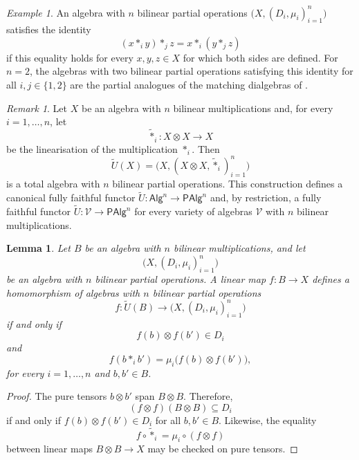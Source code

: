 \documentclass[reqno,a4paper]{amsart}
\theoremstyle{plain}
\newtheorem{lemma}[subsection]{Lemma}
\theoremstyle{definition}
\theoremstyle{remark}
\newtheorem{remark}[subsection]{Remark}
\newtheorem{example}[subsection]{Example}
\numberwithin{equation}{section}
\newcommand{\V}{\mathcal{V}}
\newcommand{\Alg}{\ensuremath{\mathsf{Alg}}}
\newcommand{\PAlg}{\ensuremath{\mathsf{PAlg}}}
\begin{document}
\begin{example}
An algebra with $n$ bilinear partial operations $\bigl(X,(D_i,\mu_i)_{i=1}^n\bigr)$ satisfies the identity
\[
(x\ast_i y)\ast_j z=x\ast_i(y\ast_j z)
\]
if this equality holds for every $x,y,z\in X$ for which both sides are defined. For $n=2$, the algebras with two bilinear partial operations satisfying this identity for all $i,j\in\{1,2\}$ are the partial analogues of the matching dialgebras of .
\end{example}

\begin{remark}\label{RemUTildeN}
Let $X$ be an algebra with $n$ bilinear multiplications and, for every $i=1,\ldots,n$, let
\[
\widetilde{\ast}_i\colon X\otimes X\to X
\]
be the linearisation of the multiplication $\ast_i$. Then
\[
\widetilde U(X)
=
\bigl(X,(X\otimes X,\widetilde{\ast}_i)_{i=1}^n\bigr)
\]
is a total algebra with $n$ bilinear partial operations. This construction defines a canonical fully faithful functor $\widetilde U\colon\Alg^n\to\PAlg^n$ and, by restriction, a fully faithful functor $\widetilde U\colon\V\to\PAlg^n$ for every variety of algebras $\V$ with $n$ bilinear multiplications.
\end{remark}

\begin{lemma}\label{LemMorphismFromTotalN}
Let $B$ be an algebra with $n$ bilinear multiplications, and let
\[
\bigl(X,(D_i,\mu_i)_{i=1}^n\bigr)
\]
be an algebra with $n$ bilinear partial operations. A linear map $f\colon B\to X$ defines a homomorphism of algebras with $n$ bilinear partial operations
\[
f\colon\widetilde U(B)\to\bigl(X,(D_i,\mu_i)_{i=1}^n\bigr)
\]
if and only if
\[
f(b)\otimes f(b')\in D_i
\]
and
\[
f(b\ast_i b')=\mu_i\bigl(f(b)\otimes f(b')\bigr),
\]
for every $i=1,\ldots,n$ and $b,b'\in B$.
\end{lemma}

\begin{proof}
The pure tensors $b\otimes b'$ span $B\otimes B$. Therefore,
\[
(f\otimes f)(B\otimes B)\subseteq D_i
\]
if and only if $f(b)\otimes f(b')\in D_i$ for all $b,b'\in B$.
Likewise, the equality
\[
f\circ\widetilde{\ast}_i
=
\mu_i\circ(f\otimes f)
\]
between linear maps $B\otimes B\to X$ may be checked on pure tensors.
\end{proof}
\end{document}
